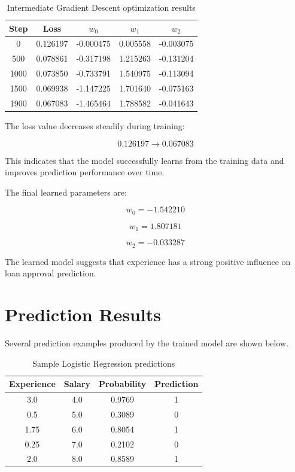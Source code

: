 \documentclass[12pt]{article}
\begin{document}
\begin{table}[h]
\centering
\begin{tabular}{ccccc}
\toprule
Step & Loss & \(w_0\) & \(w_1\) & \(w_2\) \\
\midrule
0 & 0.126197 & -0.000475 & 0.005558 & -0.003075 \\
500 & 0.078861 & -0.317198 & 1.215263 & -0.131204 \\
1000 & 0.073850 & -0.733791 & 1.540975 & -0.113094 \\
1500 & 0.069938 & -1.147225 & 1.701640 & -0.075163 \\
1900 & 0.067083 & -1.465464 & 1.788582 & -0.041643 \\
\bottomrule
\end{tabular}
\caption{Intermediate Gradient Descent optimization results}
\end{table}

The loss value decreases steadily during training:

\[
0.126197 \rightarrow 0.067083
\]

This indicates that the model successfully learns from the training data and improves prediction performance over time.

The final learned parameters are:

\[
w_0 = -1.542210
\]

\[
w_1 = 1.807181
\]

\[
w_2 = -0.033287
\]

The learned model suggests that experience has a strong positive influence on loan approval prediction.

\section{Prediction Results}

Several prediction examples produced by the trained model are shown below.

\begin{table}[h]
\centering
\begin{tabular}{cccc}
\toprule
Experience & Salary & Probability & Prediction \\
\midrule
3.0 & 4.0 & 0.9769 & 1 \\
0.5 & 5.0 & 0.3089 & 0 \\
1.75 & 6.0 & 0.8054 & 1 \\
0.25 & 7.0 & 0.2102 & 0 \\
2.0 & 8.0 & 0.8589 & 1 \\
\bottomrule
\end{tabular}
\caption{Sample Logistic Regression predictions}
\end{table}
\end{document}

